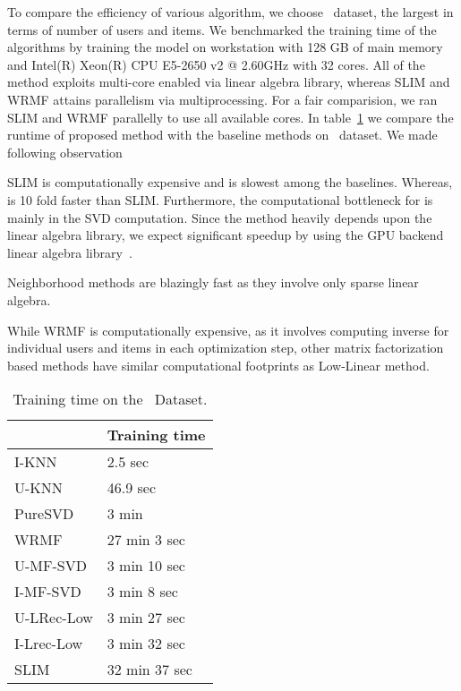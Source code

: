 
To compare the efficiency of various algorithm, we choose \Lowes\ dataset, the largest in terms of number of users and items. 
We benchmarked the training time of the algorithms 
by training the model on  workstation with 128 GB of main memory and Intel(R) Xeon(R) CPU E5-2650 v2 @ 2.60GHz with 32 cores. All of the method exploits multi-core enabled via linear algebra library, whereas SLIM and WRMF attains parallelism via multiprocessing. For a fair comparision, we ran  SLIM and WRMF parallelly to use all available cores.  In table~\ref{tbl:runtime_lowes} we compare the runtime of proposed method with the baseline methods on \Lowes\ dataset. We  made following observation
\begin{compactitem}
\item  SLIM is computationally expensive and is slowest among the baselines. Whereas, \LinearLow is 10 fold faster than SLIM. Furthermore, the computational bottleneck for \LinearLow is mainly in the SVD computation. Since the method heavily depends upon the linear algebra library, we expect significant speedup by using the GPU backend linear algebra library~\citep{Voronin:GPURSVD}. 
\item Neighborhood methods are blazingly fast as they involve only sparse linear algebra.
\item While WRMF is computationally expensive, as it involves computing inverse for individual users and items in each optimization step, other matrix factorization based methods have similar computational footprints as Low-Linear method.
\end{compactitem}
\begin{table}[!htb]
\centering
\caption{Training time on the  \Guitar\ Dataset.}
\label{tbl:runtime_lowes}
\begin{tabular}{l|l}
\hline
 & Training time \\
\hline
I-KNN & 2.5 sec \\ 
U-KNN & 46.9 sec \\
PureSVD & 3 min \\
WRMF & 27 min 3 sec \\
U-MF-SVD &  3 min 10 sec \\
I-MF-SVD & 3 min 8 sec \\ 
U-LRec-Low & 3 min 27 sec \\
I-Lrec-Low & 3 min 32 sec \\
SLIM  & 32 min 37 sec  \\
\hline
\end{tabular}
\end{table}